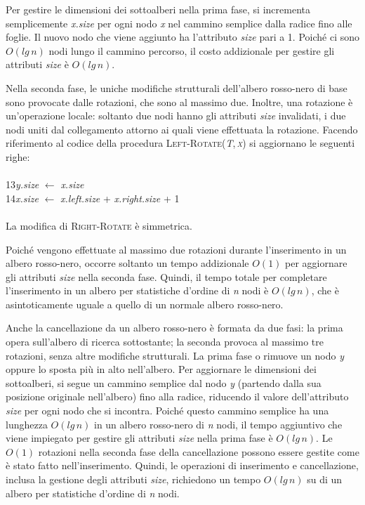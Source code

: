 \documentclass[10pt, a4paper]{report}
\newcommand\firsttab[1][0.5cm]{\hspace*{#1}}
\begin{document}
Per gestire le dimensioni dei sottoalberi nella prima fase, si incrementa semplicemente \textit{x.size} per ogni nodo \textit{x} nel cammino semplice dalla radice fino alle foglie. Il nuovo nodo che viene aggiunto ha l'attributo \textit{size} pari a 1. Poiché ci sono $O(lg\,n)$ nodi lungo il cammino percorso, il costo addizionale per gestire gli attributi \textit{size} è $O(lg\,n)$. 

Nella seconda fase, le uniche modifiche strutturali dell'albero rosso-nero di base sono provocate dalle rotazioni, che sono al massimo due. Inoltre, una rotazione è un'operazione locale: soltanto due nodi hanno gli attributi \textit{size} invalidati, i due nodi uniti dal collegamento attorno ai quali viene effettuata la rotazione. Facendo riferimento al codice della procedura \textsc{Left-Rotate(\textit{T},\,\textit{x})} si aggiornano le seguenti righe:\\\\
13\firsttab\textit{y.size} $\leftarrow$ \textit{x.size}\\
14\firsttab\textit{x.size} $\leftarrow$ \textit{x.left.size} + \textit{x.right.size} + 1\\\\
La modifica di \textsc{Right-Rotate} è simmetrica.

Poiché vengono effettuate al massimo due rotazioni durante l'inserimento in un albero rosso-nero, occorre soltanto un tempo addizionale $O(1)$ per aggiornare gli attributi \textit{size} nella seconda fase. Quindi, il tempo totale per completare l'inserimento in un albero per statistiche d'ordine di \textit{n} nodi è $O(lg\,n)$, che è asintoticamente uguale a quello di un normale albero rosso-nero.

Anche la cancellazione da un albero rosso-nero è formata da due fasi: la prima opera sull'albero di ricerca sottostante; la seconda provoca al massimo tre rotazioni, senza altre modifiche strutturali. La prima fase o rimuove un nodo \textit{y} oppure lo sposta più in alto nell'albero. Per aggiornare le dimensioni dei sottoalberi, si segue un cammino semplice dal nodo \textit{y} (partendo dalla sua posizione originale nell'albero) fino alla radice, riducendo il valore dell'attributo \textit{size} per ogni nodo che si incontra. Poiché questo cammino semplice ha una lunghezza $O(lg\,n)$ in un albero rosso-nero di \textit{n} nodi, il tempo aggiuntivo che viene impiegato per gestire gli attributi \textit{size} nella prima fase è $O(lg\,n)$. Le $O(1)$ rotazioni nella seconda fase della cancellazione possono essere gestite come è stato fatto nell'inserimento. Quindi, le operazioni di inserimento e cancellazione, inclusa la gestione degli attributi \textit{size}, richiedono un tempo $O(lg\,n)$ su di un albero per statistiche d'ordine di \textit{n} nodi.
\end{document}
